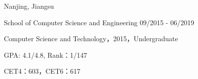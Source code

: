 \vspace{-7.0mm}

\begin{cventries}
\vspace{-1.5mm}
\cveducation
{}
{Nanjing, Jiangsu}

\cvsubeducation
{School of Computer Science and Engineering}
{09/2015 - 06/2019}
{
    \begin{cvitems}
    \item {Computer Science and Technology，2015，Undergraduate}
    \item {GPA: 4.1/4.8, Rank：1/147}
    \item{CET4：603，CET6：617}
    \end{cvitems}
}

\end{cventries}